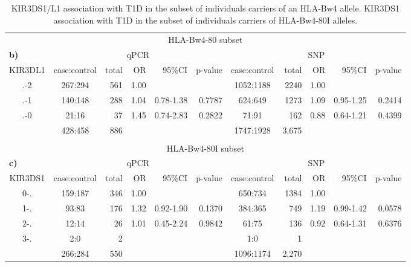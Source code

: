 \begin{table}[h]
\begin{tabularx}{\textwidth}{ccrrrr|crrrr}
  \multicolumn{11}{c}{HLA-Bw4-80 subset} \\
  \multicolumn{1}{l}{\bf{b)}} & \multicolumn{5}{c}{qPCR} & \multicolumn{5}{c}{SNP} \\
  \hline
    KIR3DL1 & case:control & total & OR & 95\%CI & p-value & case:control & total  & OR & 95\%CI & p-value \\
  \hline
    .-2 & 267:294 & 561 & 1.00 &  &  & 1052:1188 & 2240  & 1.00 &  &  \\
    .-1 & 140:148 & 288 & 1.04 & 0.78-1.38 & 0.7787 & 624:649 & 1273  & 1.09 & 0.95-1.25 & 0.2414 \\
    .-0 & 21:16 &  37 & 1.45 & 0.74-2.83 & 0.2822 & 71:91 &  162  & 0.88 & 0.64-1.21 & 0.4399 \\
  \hline
    & 428:458 & 886 &  &  &  & 1747:1928 & 3,675  &  & &  \\
  \\
  \multicolumn{11}{c}{HLA-Bw4-80I subset} \\
  \multicolumn{1}{l}{\bf{c)}} & \multicolumn{5}{c}{qPCR} & \multicolumn{5}{c}{SNP} \\
  \hline
    KIR3DS1 & case:control & total & OR & 95\%CI & p-value & case:control & total  & OR & 95\%CI & p-value \\
  \hline
    0-. & 159:187 & 346 & 1.00 &  &  & 650:734 & 1384  & 1.00 &  &  \\
    1-. & 93:83 & 176 & 1.32 & 0.92-1.90 & 0.1370 & 384:365 &  749  & 1.19 & 0.99-1.42 & 0.0578 \\
    2-. & 12:14 &  26& 1.01 & 0.45-2.24 & 0.9842 & 61:75 &  136  & 0.92 & 0.64-1.31 & 0.6376 \\
    3-. & 2:0 &   2 &  &  &  & 1:0 &    1  & &  &  \\
  \hline
    & 266:284 & 550 &  &  &  & 1096:1174 & 2,270  &  &  &  \\
  \end{tabularx}
    \caption{
        \label{table:hla-bw4-kir-t1d}
        KIR3DS1/L1 association with T1D in the subset of individuals carriers of an HLA-Bw4 allele.
        KIR3DS1 association with T1D in the subset of individuals carriers of HLA-Bw4-80I alleles.
    }
\end{table}





